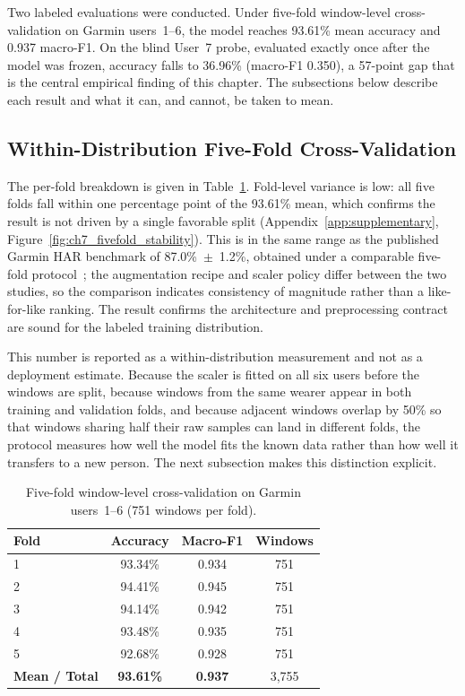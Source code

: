 Two labeled evaluations were conducted. Under five-fold window-level cross-validation on Garmin users~1--6, the model reaches 93.61\% mean accuracy and 0.937 macro-F1. On the blind User~7 probe, evaluated exactly once after the model was frozen, accuracy falls to 36.96\% (macro-F1 0.350), a 57-point gap that is the central empirical finding of this chapter. The subsections below describe each result and what it can, and cannot, be taken to mean.
\FloatBarrier

\subsection{Within-Distribution Five-Fold Cross-Validation}
\label{sec:ch7_fivefold}

The per-fold breakdown is given in Table~\ref{tab:ch7_fivefold}. Fold-level variance is low: all five folds fall within one percentage point of the 93.61\% mean, which confirms the result is not driven by a single favorable split (Appendix~\ref{app:supplementary}, Figure~\ref{fig:ch7_fivefold_stability}). This is in the same range as the published Garmin HAR benchmark of 87.0\%~$\pm$~1.2\%, obtained under a comparable five-fold protocol~\cite{oleh2025recognition}; the augmentation recipe and scaler policy differ between the two studies, so the comparison indicates consistency of magnitude rather than a like-for-like ranking. The result confirms the architecture and preprocessing contract are sound for the labeled training distribution.

This number is reported as a within-distribution measurement and not as a deployment estimate. Because the scaler is fitted on all six users before the windows are split, because windows from the same wearer appear in both training and validation folds, and because adjacent windows overlap by 50\% so that windows sharing half their raw samples can land in different folds, the protocol measures how well the model fits the known data rather than how well it transfers to a new person. The next subsection makes this distinction explicit.

\renewcommand{\arraystretch}{1.15}
\begin{table}[htbp]
\centering
\footnotesize
\caption[Five-fold window-level cross-validation on Garmin users~1--6 (751...]{Five-fold window-level cross-validation on Garmin users~1--6 (751 windows per fold).}
\label{tab:ch7_fivefold}
\begin{tabular}{lccc}
\toprule
\textbf{Fold} & \textbf{Accuracy} & \textbf{Macro-F1} & \textbf{Windows} \\
\midrule
1 & 93.34\% & 0.934 & 751 \\
2 & 94.41\% & 0.945 & 751 \\
3 & 94.14\% & 0.942 & 751 \\
4 & 93.48\% & 0.935 & 751 \\
5 & 92.68\% & 0.928 & 751 \\
\midrule
\textbf{Mean / Total} & \textbf{93.61\%} & \textbf{0.937} & 3{,}755 \\
\bottomrule
\end{tabular}
\renewcommand{\arraystretch}{1.0}
\end{table}

